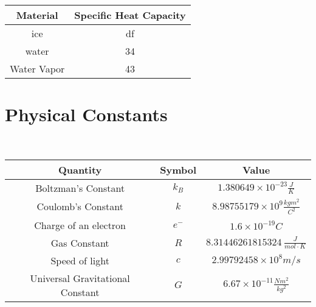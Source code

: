 \newpage




\begin{table}[h]
	\caption{\label{tab:specificheat}Table of Specific Heat Capacities of Common Materials}
	
	\begin{longtable}{|c |c|}
		\hline
		Material & Specific Heat Capacity  \\
		\hline
		ice & df \\
		\hline
		water & 34  \\
		\hline
		Water Vapor &  43 \\
		\hline
		
	\end{longtable}
\end{table}
 \newpage




\section{Physical Constants}

\
\begin{table}[h]
	\caption{\label{tab:Constants}Table of Common Physical Constants}
	
	\begin{longtable}{|c |c| c |}
		\hline
		Quantity & Symbol & Value \\
		\hline
		Boltzman's Constant & $k_B$ & 	$1.380649 \times 10^{-23}\si{\frac{J}{K}}$ \\
		\hline
		Coulomb's Constant & $k$ & $8.98755179 \times 10^9\si{\frac{kg m^2}{C^2}}$ \\
		\hline
		Charge of an electron & $e^-$ & $1.6 \times 10^{-19}\si{C}$ \\
		\hline
		Gas Constant & $R$ &  $ \SI{8.31446261815324}{\frac{J}{mol\cdot K}} $\\
		\hline
		Speed of light & $c$ & $2.99792458 \times 10^8 \si{m/s}$ \\
		\hline
		Universal Gravitational Constant &  $G$ & $6.67 \times 10^{-11} \si{\frac{Nm^2}{kg^2}}$ \\
		\hline
	
	\end{longtable}
\end{table}
